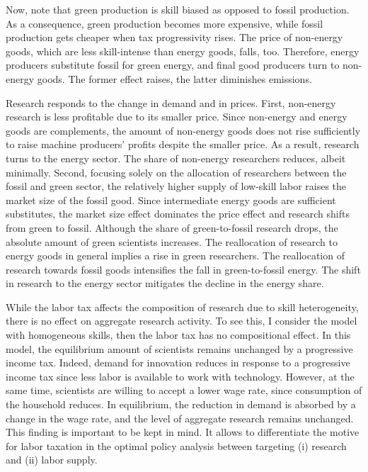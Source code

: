  
 Now, note that green production is skill biased as opposed to fossil production.
 As a  consequence, green production becomes more expensive, while fossil production gets cheaper when tax progressivity rises. The price of non-energy goods, which are less skill-intense than energy goods, falls, too. Therefore, energy producers substitute fossil for green energy, and final good producers turn to non-energy goods. The former effect raises, the latter diminishes emissions.
 
 
 Research responds to the change in demand and in prices. First, non-energy research is less profitable due to its smaller price. Since non-energy and energy goods are complements, the amount of non-energy goods does not rise sufficiently to raise machine producers' profits despite the smaller price. As a result, research turns to the energy sector. The share of non-energy researchers reduces, albeit minimally. %
 Second, focusing solely on the allocation of researchers between the fossil and green sector, the relatively higher supply of low-skill labor raises the market size of the fossil good. Since intermediate energy goods are sufficient substitutes, the market size effect dominates the price effect and research shifts from green to fossil.
 Although the share of green-to-fossil research drops, the absolute amount of green scientists increases. The reallocation of research to energy goods in general implies a rise in green researchers. The reallocation of research towards fossil goods intensifies the fall in green-to-fossil energy. The shift in research to the energy sector mitigates the decline in the energy share. 
 
 While the labor tax affects the composition of research due to skill heterogeneity, there is no effect on aggregate research activity. 
 To see this, I consider the model with homogeneous skills, then the labor tax has no compositional effect. In this model, the equilibrium amount of scientists remains unchanged by a progressive income tax. Indeed, demand for innovation reduces in response to a progressive income tax since less labor is available to work with technology. However, at the same time, scientists are willing to accept a lower wage rate, since consumption of the household reduces. In equilibrium, the reduction in demand is absorbed by a change in the wage rate, and the level of aggregate research remains unchanged. 
 This finding is important to be kept in mind. It allows to differentiate the motive for labor taxation in the optimal policy analysis between  targeting (i) research and (ii) labor supply. 
 
